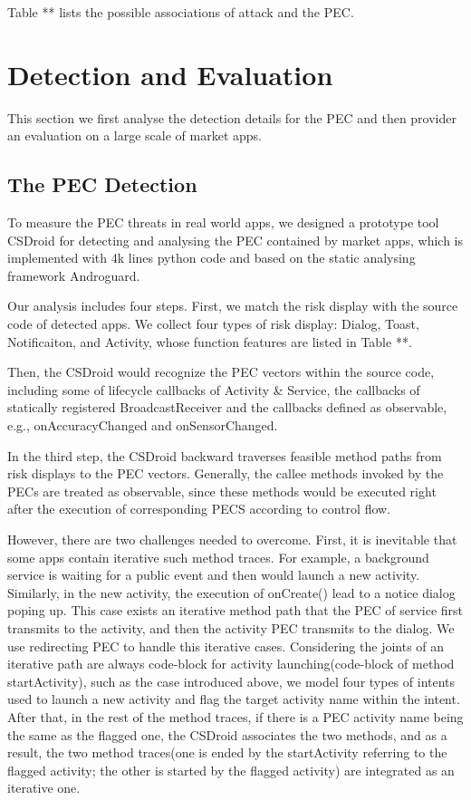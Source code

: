 \documentclass{sig-alternate-05-2015}
\begin{document}
Table ** lists the possible associations of attack and the PEC.


\section{Detection and Evaluation}
This section we first analyse the detection details for the PEC and then provider an evaluation on a large scale of market apps.
\subsection{The PEC Detection}

To measure the PEC threats in real world apps, we designed a prototype tool CSDroid for detecting and analysing the PEC contained by market apps, which is implemented with 4k lines python code and based on the static analysing framework Androguard\cite{desnos2013androguard}. 

Our analysis includes four steps. 
First, we match the risk display with the source code of detected apps. We collect four types of risk display: Dialog, Toast, Notificaiton, and Activity, whose function features are listed in Table **. 

Then, the CSDroid would recognize the PEC vectors within the source code, including some of lifecycle callbacks of Activity \& Service, the callbacks of statically registered BroadcastReceiver and the callbacks defined as observable, e.g., onAccuracyChanged and onSensorChanged.

In the third step, the CSDroid backward traverses feasible method paths from risk displays to the PEC vectors. Generally, the callee methods invoked by the PECs are treated as observable, since these methods would be executed right after the execution of corresponding PECS according to control flow.

However, there are two challenges needed to overcome. 
First, it is inevitable that some apps contain iterative such method traces. For example, a background service is waiting for a public event and then would launch a new activity. Similarly, in the new activity, the execution of onCreate() lead to a notice dialog poping up. This case exists an iterative method path that the PEC of service first transmits to the activity, and then the activity PEC transmits to the dialog. We use redirecting PEC to handle this iterative cases. Considering the joints of an iterative path are always code-block for activity launching(code-block of method startActivity), such as the case introduced above, we model four types of intents used to launch a new activity and flag the target activity name within the intent. After that, in the rest of the method traces, if there is a PEC activity name being the same as the flagged one, the CSDroid associates the two methods, and as a result, the two method traces(one is ended by the startActivity referring to the flagged activity; the other is started by the flagged activity) are integrated as an iterative one.
\end{document}
